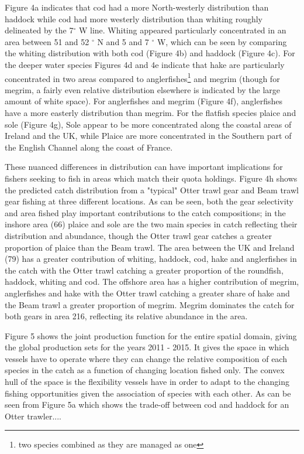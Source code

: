 \documentclass{nature}
\begin{document}
\begin{linenumbers}
Figure 4a indicates that cod had a more North-westerly distribution than
haddock while cod had more westerly distribution than whiting roughly
delineated by the 7$^{\circ}$ W line. Whiting appeared particularly
concentrated in an area between 51 and 52 $^{\circ}$ N and 5 and 7 $^{\circ}$
W, which can be seen by comparing the whiting distribution with both cod
(Figure 4b) and haddock (Figure 4c). For the deeper water species Figures 4d and 4e
indicate that hake are particularly concentrated in two areas compared to
anglerfishes\footnote{two species combined as they are managed as one} and
megrim (though for megrim, a fairly even relative distribution elsewhere is
indicated by the large amount of white space). For anglerfishes and megrim
(Figure 4f), anglerfishes have a more easterly distribution than megrim. For
the flatfish species plaice and sole (Figure 4g), Sole appear to be more
concentrated along the coastal areas of Ireland and the UK, while Plaice are
more concentrated in the Southern part of the English Channel along the coast
of France.

These nuanced differences in distribution can have important implications for
fishers seeking to fish in areas which match their quota holdings. Figure 4h
shows the predicted catch distribution from a "typical" Otter trawl gear and
Beam trawl gear fishing at three different locations. As can be seen, both the
gear selectivity and area fished play important contributions to the catch
compositions; in the inshore area (66) plaice and sole are the two main species
in catch reflecting their distribution and abundance, though the Otter trawl
gear catches a greater proportion of plaice than the Beam trawl. The area
between the UK and Ireland (79) has a greater contribution of whiting, haddock,
cod, hake and anglerfishes in the catch with the Otter trawl catching a greater
proportion of the roundfish, haddock, whiting and cod. The offshore area has a
higher contribution of megrim, anglerfishes and hake with the Otter trawl
catching a greater share of hake and the Beam trawl a greater proportion of
megrim. Megrim dominates the catch for both gears in area 216, reflecting its
relative abundance in the area.

Figure 5 shows the joint production function for the entire spatial domain,
giving the global production sets for the years 2011 - 2015. It gives the space
in which vessels have to operate where they can change the relative composition
of each species in the catch as a function of changing location fished only.
The convex hull of the space is the flexibility vessels have in order to adapt
to the changing fishing opportunities given the association of species with
each other\cite{Reimer2017}. As can be seen from Figure 5a which shows the
trade-off between cod and haddock for an Otter trawler....


\end{linenumbers}
\end{document}
